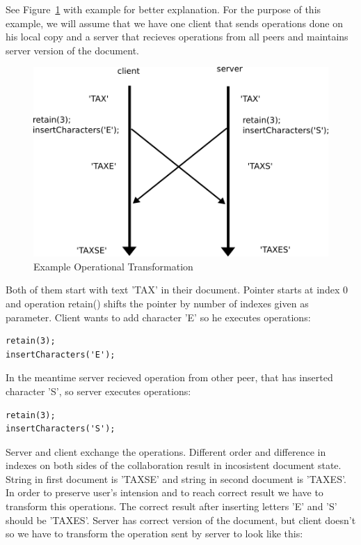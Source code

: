 \documentclass[12pt,oneside]{fithesis2}
\begin{document}
\par See Figure~\ref{fig:ot} with example for better explanation. For the purpose of this example, we will assume that we have one client that sends operations done on his local copy and a server that recieves operations from all peers and maintains server version of the document. 
\begin{figure}[H]
\caption{Example Operational Transformation}
\label{fig:ot}
\centering
\vspace{5mm}
\includegraphics{example}
\end{figure}
Both of them start with text 'TAX' in their document. Pointer starts at index 0 and operation retain() shifts the pointer by number of indexes given as parameter. Client wants to add character 'E' so he executes operations:
\vspace{3mm}
\begin{verbatim}
retain(3);
insertCharacters('E');
\end{verbatim} 
\vspace{3mm}
In the meantime server recieved operation from other peer, that has inserted character 'S', so server executes operations:
\vspace{3mm} 
\begin{verbatim}
retain(3);
insertCharacters('S');
\end{verbatim}
\vspace{3mm}
Server and client exchange the operations. Different order and difference in indexes on both sides of the collaboration result in incosistent document state. String in first document is 'TAXSE' and string in second document is 'TAXES'.  In order to preserve user's intension and to reach correct result we have to transform this operations. The correct result after inserting letters 'E' and 'S' should be 'TAXES'. Server has correct version of the document, but client doesn't so we have to transform the operation sent by server to look like this:
\end{document}
